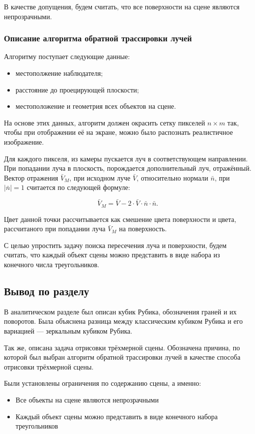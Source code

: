 В качестве допущения, будем считать, что все поверхности на сцене являются непрозрачными.

\subsubsection{Описание алгоритма обратной трассировки лучей}
Алгоритму поступает следующие данные:
\begin{itemize}
	\item местополжение наблюдателя;
	\item расстояние до проецирующей плоскости;
	\item местоположение и геометрия всех объектов на сцене.
\end{itemize}

На основе этих данных, алгоритм должен окрасить сетку пикселей $n\times m$ так, чтобы при отображении её на экране, можно было распознать реалистичное изображение.

Для каждого пикселя, из камеры пускается луч в соответствующем направлении. При попадании луча в плоскость, порождается дополнительный луч, отражённый. Вектор отражения $\bar V_M$, при исходном луче $\bar V$, относительно нормали $\bar n$, при $|\bar n| = 1$ считается по следующей формуле:

\begin{equation}
	\bar V_M = \bar V - 2\cdot\bar V \cdot\bar n\cdot\bar n.
	\label{eq:bounce}
\end{equation}

Цвет данной точки рассчитывается как смешение цвета поверхности и цвета, рассчитаного при попадании луча $\bar V_M$ на поверхность.

С целью упростить задачу поиска пересечения луча и поверхности, будем считать, что каждый объект сцены можно представить в виде набора из конечного числа треугольников.

\subsection{Вывод по разделу}
В аналитическом разделе был описан кубик Рубика, обозначения граней и их поворотов. Была объяснена разница между классическим кубиком Рубика и его вариацией --- зеркальным кубиком Рубика.

Так же, описана задача отрисовки трёхмерной сцены. Обозначена причина, по которой был выбран алгоритм обратной трассировки лучей в качестве способа отрисовки трёхмерной сцены.

Были установлены ограничения по содержанию сцены, а именно:
\begin{itemize}
	\item Все объекты на сцене являются непрозрачными
	\item Каждый объект сцены можно представить в виде конечного набора треугольников
\end{itemize}

